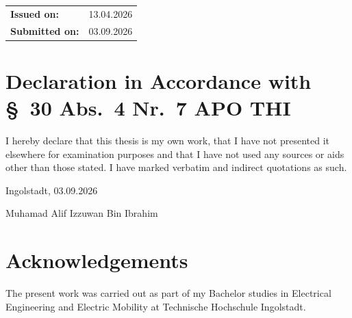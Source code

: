 \documentclass[11pt,a4paper,oneside,parskip=half]{scrreprt}
\begin{document}
\begin{titlepage}
\begin{center}
\vspace{1.2cm}

\begin{flushleft}
\hspace{1.2cm}
\begin{tabular}{@{}p{5.2cm}l@{}}
\textbf{Issued on:}    & 13.04.2026 \\[2pt]
\textbf{Submitted on:} & 03.09.2026 \\
\end{tabular}
\end{flushleft}

\end{center}
\end{titlepage}

\chapter*{Declaration in Accordance with \S~30 Abs.~4 Nr.~7 APO THI}
\thispagestyle{plain}

\noindent I hereby declare that this thesis is my own work, that I have not presented it elsewhere for examination purposes and that I have not used any sources or aids other than those stated. I have marked verbatim and indirect quotations as such.

\vspace{0.2cm}

\noindent Ingolstadt, 03.09.2026

\vspace{1.2cm}

\noindent Muhamad Alif Izzuwan Bin Ibrahim

\chapter*{Acknowledgements}
\thispagestyle{plain}

The present work was carried out as part of my Bachelor studies in Electrical Engineering and Electric Mobility at Technische Hochschule Ingolstadt.
\end{document}
